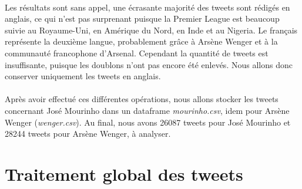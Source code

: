 \documentclass[14pt, openany]{article}
\begin{document}
\paragraph{}
Les résultats sont sans appel, une écrasante majorité des tweets sont rédigés en anglais, ce qui n'est pas surprenant puisque la Premier League est beaucoup suivie au Royaume-Uni, en Amérique du Nord, en Inde et au Nigeria. Le français représente la deuxième langue, probablement grâce à Arsène Wenger et à la communauté francophone d'Arsenal. Cependant la quantité de tweets est insuffisante, puisque les doublons n'ont pas encore été enlevés. Nous allons donc conserver uniquement les tweets en anglais.
\paragraph{}
Après avoir effectué ces différentes opérations, nous allons stocker les tweets concernant José Mourinho dans un dataframe \textit{mourinho.csv}, idem pour Arsène Wenger (\textit{wenger.csv}). Au final, nous avons 26087 tweets pour José Mourinho et 28244 tweets pour Arsène Wenger, à analyser.
\section{Traitement global des tweets}
\end{document}
